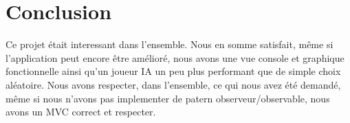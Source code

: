 \chapter{Conclusion}

	Ce projet était interessant dans l'ensemble. Nous en somme satisfait, même si l'application peut encore être amélioré, nous avons une vue console et graphique fonctionnelle ainsi qu'un joueur IA un peu plus performant que de simple choix aléatoire.
    Nous avons respecter, dans l'ensemble, ce qui nous avez été demandé, même si nous n'avons pas implementer de patern observeur/observable, nous avons un MVC correct et respecter.
